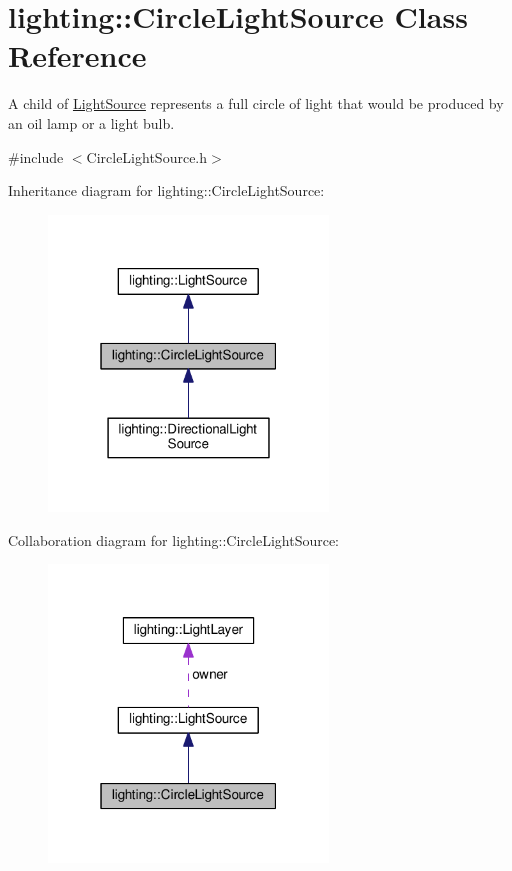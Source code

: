 \hypertarget{classlighting_1_1CircleLightSource}{}\section{lighting\+:\+:Circle\+Light\+Source Class Reference}
\label{classlighting_1_1CircleLightSource}


A child of \hyperlink{classlighting_1_1LightSource}{Light\+Source} represents a full circle of light that would be produced by an oil lamp or a light bulb.  




{\ttfamily \#include $<$Circle\+Light\+Source.\+h$>$}



Inheritance diagram for lighting\+:\+:Circle\+Light\+Source\+:\nopagebreak
\begin{figure}[H]
\begin{center}
\leavevmode
\includegraphics[width=211pt]{classlighting_1_1CircleLightSource__inherit__graph}
\end{center}
\end{figure}


Collaboration diagram for lighting\+:\+:Circle\+Light\+Source\+:\nopagebreak
\begin{figure}[H]
\begin{center}
\leavevmode
\includegraphics[width=211pt]{classlighting_1_1CircleLightSource__coll__graph}
\end{center}
\end{figure}
